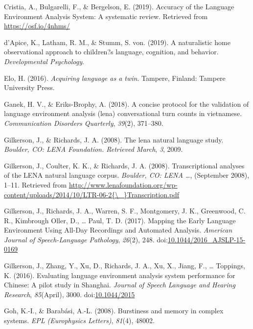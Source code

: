 \documentclass[english,floatsintext,man]{apa6}
\begin{document}
\hypertarget{ref-Cristia}{}
Cristia, A., Bulgarelli, F., \& Bergelson, E. (2019). Accuracy of the
Language Environment Analysis System: A systematic review. Retrieved
from \url{https://osf.io/4nhms/}

\hypertarget{ref-d2019naturalistic}{}
d'Apice, K., Latham, R. M., \& Stumm, S. von. (2019). A naturalistic
home observational approach to children?s language, cognition, and
behavior. \emph{Developmental Psychology}.

\hypertarget{ref-Elo}{}
Elo, H. (2016). \emph{Acquiring language as a twin}. Tampere, Finland:
Tampere University Press.

\hypertarget{ref-ganek2018concise}{}
Ganek, H. V., \& Eriks-Brophy, A. (2018). A concise protocol for the
validation of language environment analysis (lena) conversational turn
counts in vietnamese. \emph{Communication Disorders Quarterly},
\emph{39}(2), 371--380.

\hypertarget{ref-gilkerson2008lena}{}
Gilkerson, J., \& Richards, J. A. (2008). The lena natural language
study. \emph{Boulder, CO: LENA Foundation. Retrieved March}, \emph{3},
2009.

\hypertarget{ref-Gilkerson2008ltr6}{}
Gilkerson, J., Coulter, K. K., \& Richards, J. A. (2008).
Transcriptional analyses of the LENA natural language corpus.
\emph{Boulder, CO: LENA \ldots{}}, (September 2008), 1--11. Retrieved
from
\href{http://www.lenafoundation.org/wp-content/uploads/2014/10/LTR-06-2\%7B/_\%7DTranscription.pdf}{http://www.lenafoundation.org/wp-content/uploads/2014/10/LTR-06-2\{\textbackslash{}\_\}Transcription.pdf}

\hypertarget{ref-Gilkerson2017}{}
Gilkerson, J., Richards, J. A., Warren, S. F., Montgomery, J. K.,
Greenwood, C. R., Kimbrough Oller, D., \ldots{} Paul, T. D. (2017).
Mapping the Early Language Environment Using All-Day Recordings and
Automated Analysis. \emph{American Journal of Speech-Language
Pathology}, \emph{26}(2), 248.
doi:\href{https://doi.org/10.1044/2016_AJSLP-15-0169}{10.1044/2016\_AJSLP-15-0169}

\hypertarget{ref-Gilkerson2016}{}
Gilkerson, J., Zhang, Y., Xu, D., Richards, J. A., Xu, X., Jiang, F.,
\ldots{} Toppings, K. (2016). Evaluating language environment analysis
system performance for Chinese: A pilot study in Shanghai. \emph{Journal
of Speech Language and Hearing Research}, \emph{85}(April), 3000.
doi:\href{https://doi.org/10.1044/2015}{10.1044/2015}

\hypertarget{ref-goh2008burstiness}{}
Goh, K.-I., \& Barabási, A.-L. (2008). Burstiness and memory in complex
systems. \emph{EPL (Europhysics Letters)}, \emph{81}(4), 48002.
\end{document}
